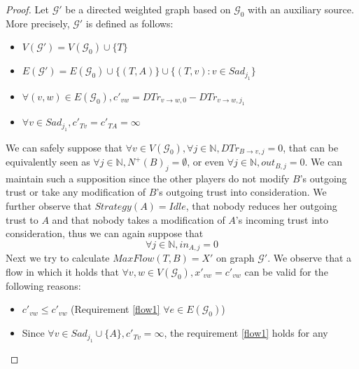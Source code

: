 \documentclass[11pt]{article}
\theoremstyle{definition}
\theoremstyle{corollary}
\theoremstyle{lemma}
\begin{document}
    \begin{proof}
       Let $\mathcal{G}'$ be a directed weighted graph based on $\mathcal{G}_0$ with an auxiliary source. More precisely,
       $\mathcal{G}'$ is defined as follows:
       \begin{itemize}
          \item $V(\mathcal{G}') = V(\mathcal{G}_0) \cup \{T\}$
          \item $E(\mathcal{G}') = E(\mathcal{G}_0) \cup \{(T, A)\} \cup \{(T, v) : v \in Sad_{j_1}\}$
          \item $\forall (v, w) \in E(\mathcal{G}_0), c'_{vw} = DTr_{v \rightarrow w, 0} - DTr_{v \rightarrow w, j_1}$
          \item $\forall v \in Sad_{j_1}, c'_{Tv} = c'_{TA} = \infty$
       \end{itemize}
       We can safely suppose that $\forall v \in V(\mathcal{G}_0), \forall j \in \mathbb{N}, DTr_{B \rightarrow v, j} = 0$,
       that can be equivalently seen as $\forall j \in \mathbb{N}, N^{+}(B)_j = \emptyset$, or even $\forall j \in
       \mathbb{N}, out_{B, j} = 0$. We can maintain such a supposition since the other players do not modify $B$'s outgoing
       trust or take any modification of $B$'s outgoing trust into consideration. We further observe that $Strategy(A) =
       Idle$, that nobody reduces her outgoing trust to $A$ and that nobody takes a modification of $A$'s incoming trust into
       consideration, thus we can again suppose that
       \begin{equation}
       \label{Aincoming}
          \forall j \in \mathbb{N}, in_{A, j} = 0
       \end{equation}
       Next we try to calculate $MaxFlow(T, B) = X'$ on graph $\mathcal{G}'$. We observe that a flow in which it holds that
       $\forall v, w \in V(\mathcal{G}_0), x'_{vw} = c'_{vw}$ can be valid for the following reasons:
       \begin{itemize}
          \item $c'_{vw} \leq c'_{vw}$ (Requirement \ref{flow1} $\forall e \in E(\mathcal{G}_0)$)
          \item Since $\forall v \in Sad_{j_1} \cup \{A\}, c'_{Tv} = \infty$, the requirement \ref{flow1} holds for any

\end{itemize}
\end{proof}
\end{document}
